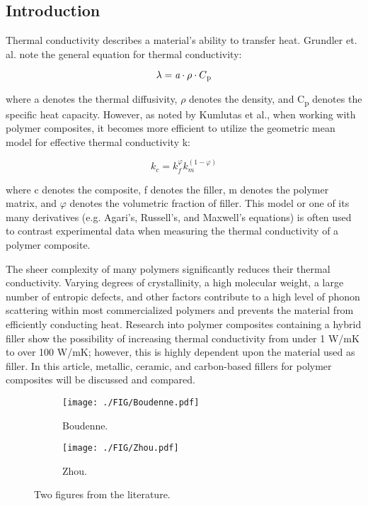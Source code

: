 \documentclass[11pt]{article}
\begin{document}
\begin{multicols}{2}

\section{Introduction}

Thermal conductivity describes a material's ability to transfer heat.
Grundler et. al. note the general equation for thermal conductivity:

\begin{equation}
  \lambda = \emph{a} \cdot \rho \cdot C\textsubscript{p} 
\end{equation}

where a denotes the thermal diffusivity, \( \rho \) denotes the density, and
C\textsubscript{p}­ denotes the specific heat capacity.\cite{Grundler-2016}
However, as noted by Kumlutas et al., when working with polymer composites, it
becomes more efficient to utilize the geometric mean model for effective
thermal conductivity k:

\begin{equation}
k_c=k_f^\varphi k_m^{(1-\varphi)}
\end{equation}

where c denotes the composite, f denotes the filler, m denotes the
polymer matrix, and \( \varphi \) denotes the volumetric fraction of filler.\cite{Kumlutas-2003-113}
This model or one of its many derivatives (e.g. Agari's, Russell's, and
Maxwell's equations) is often used to contrast experimental data when
measuring the thermal conductivity of a polymer composite.

The sheer complexity of many polymers significantly reduces their
thermal conductivity. Varying degrees of crystallinity, a high molecular
weight, a large number of entropic defects, and other factors contribute
to a high level of phonon scattering within most commercialized polymers
and prevents the material from efficiently conducting heat. Research
into polymer composites containing a hybrid filler show the possibility
of increasing thermal conductivity from under 1 W/mK to over 100 W/mK;
however, this is highly dependent upon the material used as filler. In
this article, metallic, ceramic, and carbon-based fillers for polymer
composites will be discussed and compared.

\end{multicols}

\begin{figure}[t]
\begin{subfigure}{.5\textwidth}
  \centering
  \texttt{[image: ./FIG/Boudenne.pdf]}  
  \caption{Boudenne. \cite{Boudenne-2005-1545}}
  \label{fig:Boudenne}
\end{subfigure}
\begin{subfigure}{.5\textwidth}
  \centering
  \texttt{[image: ./FIG/Zhou.pdf]}  
  \caption{Zhou. \cite{Zhou-2007-1863}}
  \label{fig:Zhou}
\end{subfigure}
\caption{Two figures from the literature.}
\label{fig:fig}
\end{figure}
\end{document}
